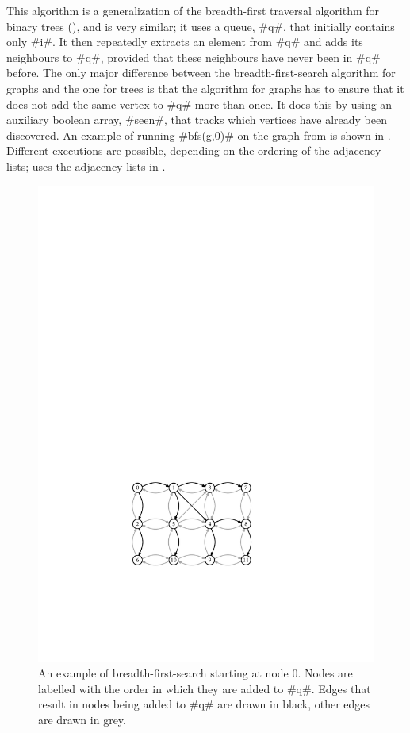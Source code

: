 This algorithm is a generalization of the breadth-first traversal
algorithm for binary trees (), and is
very similar; it uses a queue, #q#, that initially contains only #i#.
It then repeatedly extracts an element from #q# and adds its neighbours
to #q#, provided that these neighbours have never been in #q# before.
The only major difference between the breadth-first-search algorithm
for graphs and the one for trees is that the algorithm for graphs has
to ensure that it does not add the same vertex to #q# more than once.
It does this by using an auxiliary boolean array, #seen#, that tracks
which vertices have already been discovered.
An example of running #bfs(g,0)# on the graph from 
is shown in .  Different executions are possible,
depending on the ordering of the adjacency lists; 
uses the adjacency lists in .

\begin{figure}
	\begin{center}
		\includegraphics[scale=0.90909]{figs/graph-bfs}
	\end{center}
	\caption[Breadth-first-search]{An example of breadth-first-search starting at node 0. Nodes are
		labelled with the order in which they are added to #q#.  Edges that
		result in nodes being added to #q# are drawn in black, other edges
		are drawn in grey.}
\end{figure}


